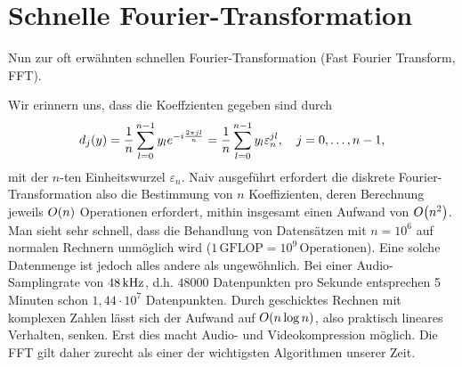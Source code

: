 \documentclass{lecture}
\begin{document}
    \section*{Schnelle Fourier-Transformation}

    Nun zur oft erwähnten schnellen Fourier-Transformation (Fast Fourier Transform, FFT).

    \begin{remark}
        Wir erinnern uns, dass die Koeffzienten gegeben sind durch
        \[
            d_j\parentheses*{y} = \frac{1}{n}\sum_{l = 0}^{n - 1}y_l e^{-i\frac{2\pi jl}{n}} = \frac{1}{n}\sum_{l = 0}^{n - 1}y_l\varepsilon_n^{jl}, \quad j = 0, \ldots, n - 1,
        \]
        mit der \(n\)-ten Einheitswurzel \(\varepsilon_n\).
        Naiv ausgeführt erfordert die diskrete Fourier-Transformation also die Bestimmung von \(n\) Koeffizienten, deren Berechnung jeweils \(O\parentheses*{n}\) Operationen erfordert, mithin insgesamt einen Aufwand von \(O\parentheses*{n^2}\).
        Man sieht sehr schnell, dass die Behandlung von Datensätzen mit \(n = 10^6\) auf normalen Rechnern unmöglich wird (\(1\,\text{GFLOP} = 10^9\,\text{Operationen}\)).
        Eine solche Datenmenge ist jedoch alles andere als ungewöhnlich.
        Bei einer Audio-Samplingrate von \(48\,\si{\kilo\hertz}\), d.h. \(48000\) Datenpunkten pro Sekunde entsprechen 5 Minuten schon \(1,44 \cdot 10^7\) Datenpunkten.
        Durch geschicktes Rechnen mit komplexen Zahlen lässt sich der Aufwand auf \(O\parentheses*{n\log n}\), also praktisch lineares Verhalten, senken.
        Erst dies macht Audio- und Videokompression möglich.
        Die FFT gilt daher zurecht als einer der wichtigsten Algorithmen unserer Zeit.
    \end{remark}
\end{document}
